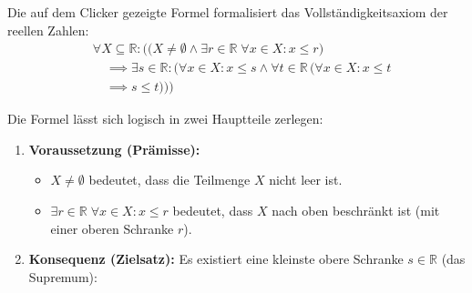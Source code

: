 \begin{math-stroke}
Die auf dem Clicker gezeigte Formel formalisiert das Vollständigkeitsaxiom der reellen Zahlen:
\begin{align}
\label{eq:vollstaendigkeit}
& \forall X \subseteq \mathbb{R} \colon \Big( \bigl( X \neq \emptyset \land \exists r \in \mathbb{R} \; \forall x \in X \colon x \le r \bigr) \nonumber \\
& \quad \implies \exists s \in \mathbb{R} \colon \bigl( \forall x \in X \colon x \le s \land \forall t \in \mathbb{R} \, (\forall x \in X \colon x \le t \nonumber \\
& \quad \implies s \le t) \bigr) \Big)
\end{align}

\begin{explanation-of-steps}
Die Formel lässt sich logisch in zwei Hauptteile zerlegen:
\begin{enumerate}[label=\textbf{\arabic*.}]
    \item \textbf{Voraussetzung (Prämisse):} 
    \begin{itemize}
        \item $X \neq \emptyset$ bedeutet, dass die Teilmenge $X$ nicht leer ist.
        \item $\exists r \in \mathbb{R} \; \forall x \in X \colon x \le r$ bedeutet, dass $X$ nach oben beschränkt ist (mit einer oberen Schranke $r$).
    \end{itemize}
    \item \textbf{Konsequenz (Zielsatz):} Es existiert eine kleinste obere Schranke $s \in \mathbb{R}$ (das Supremum):
\end{enumerate}
\end{explanation-of-steps}
\end{math-stroke}

